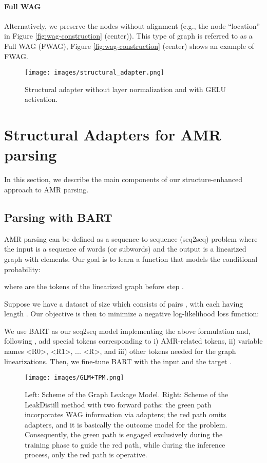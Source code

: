 \documentclass[11pt]{article}
\begin{document}
\paragraph{Full WAG}\label{align_full_graph}
Alternatively, we preserve the nodes without alignment (e.g., the node ``location'' in Figure \ref{fig:wag-construction} (center)). This type of graph is referred to as a Full WAG (FWAG), Figure \ref{fig:wag-construction} (center) shows an example of FWAG. 
\begin{figure}[!t]
  \centering
  \texttt{[image: images/structural\_adapter.png]}

  \caption{Structural adapter without layer normalization and with GELU activation.}
  \label{fig:struct-adapter}
\end{figure}

\section{Structural Adapters for AMR parsing}
\label{sec:components}

In this  section, we describe the main components of our structure-enhanced approach to AMR parsing. 

\subsection{Parsing with BART}\label{sec:parsing_transformers}
AMR parsing can be defined as a sequence-to-sequence (seq2seq) problem where the input  is a sequence of  words (or subwords) and the output  is a linearized graph with  elements. Our goal is to learn a function that models the conditional probability:

where  are the tokens of the linearized graph  before step .

Suppose we have a dataset  of size  which consists of pairs , with each  having length . Our objective is then to minimize a negative log-likelihood loss function:




We use BART as our seq2seq model implementing the above formulation and, following \citet[SPRING]{blloshmi-etal-2021-spring},  add special tokens corresponding to i) AMR-related tokens, ii) variable names <R0>, <R1>, ... <R>, and iii) other tokens needed for the graph linearizations. Then, we fine-tune BART with the input  and the target . 


\begin{figure*}[!htp]
  \centering
  \texttt{[image: images/GLM+TPM.png]}
  \caption{Left: Scheme of the Graph Leakage Model. Right: Scheme of the LeakDistill method with two forward paths:
the green path incorporates WAG information via adapters; the red path omits adapters, and it is basically the outcome model for the problem. Consequently, the green path is engaged exclusively during the training phase to guide the red path, while during the inference process, only the red path is operative.}
  \label{fig:gnn-encoder}
\end{figure*}
\end{document}
